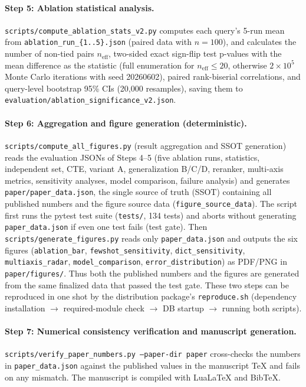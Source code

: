 \paragraph{Step 5: Ablation statistical analysis.}
\texttt{scripts/compute\_ablation\_stats\_v2.py} computes each query's 5-run mean from \texttt{ablation\_run\_\{1..5\}.json} (paired data with $n=100$), and calculates the number of non-tied pairs $n_\mathrm{eff}$, two-sided exact sign-flip test p-values with the mean difference as the statistic (full enumeration for $n_\mathrm{eff}\leq20$, otherwise $2\times10^5$ Monte Carlo iterations with seed 20260602), paired rank-biserial correlations, and query-level bootstrap 95\% CIs (20{,}000 resamples), saving them to \texttt{evaluation/ablation\_significance\_v2.json}.

\paragraph{Step 6: Aggregation and figure generation (deterministic).}
\texttt{scripts/compute\_all\_figures.py} (result aggregation and SSOT generation) reads the evaluation JSONs of Steps 4--5 (five ablation runs, statistics, independent set, CTE, variant A, generalization B/C/D, reranker, multi-axis metrics, sensitivity analyses, model comparison, failure analysis) and generates \texttt{paper/paper\_data.json}, the single source of truth (SSOT) containing all published numbers and the figure source data (\texttt{figure\_source\_data}). The script first runs the pytest test suite (\texttt{tests/}, 134 tests) and aborts without generating \texttt{paper\_data.json} if even one test fails (test gate). Then \texttt{scripts/generate\_figures.py} reads only \texttt{paper\_data.json} and outputs the six figures (\texttt{ablation\_bar}, \texttt{fewshot\_sensitivity}, \texttt{dict\_sensitivity}, \texttt{multiaxis\_radar}, \texttt{model\_comparison}, \texttt{error\_distribution}) as PDF/PNG in \texttt{paper/figures/}. Thus both the published numbers and the figures are generated from the same finalized data that passed the test gate. These two steps can be reproduced in one shot by the distribution package's \texttt{reproduce.sh} (dependency installation $\to$ required-module check $\to$ DB startup $\to$ running both scripts).

\paragraph{Step 7: Numerical consistency verification and manuscript generation.}
\texttt{scripts/verify\_paper\_numbers.py --paper-dir paper} cross-checks the numbers in \texttt{paper\_data.json} against the published values in the manuscript TeX and fails on any mismatch. The manuscript is compiled with LuaLaTeX and BibTeX.

